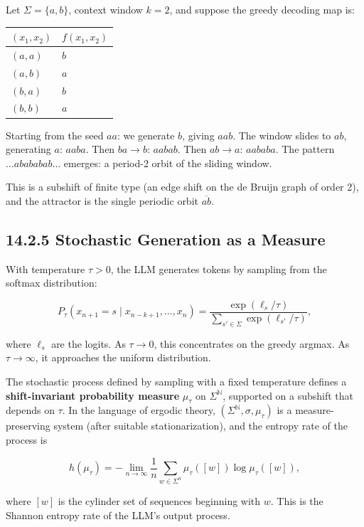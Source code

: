 \begin{example}
Let $\Sigma = \{ a, b\} $, context window $k = 2$, and suppose the greedy decoding map is:

\begin{tabular}{|l|l|}
\hline
$(x_1, x_2)$ & $f(x_1, x_2)$ \\
\hline
$(a, a)$ & $b$ \\
$(a, b)$ & $a$ \\
$(b, a)$ & $b$ \\
$(b, b)$ & $a$ \\
\hline
\end{tabular}


Starting from the seed $aa$: we generate $b$, giving $aab$. The window slides to $ab$, generating $a$: $aaba$. Then $ba \to b$: $aabab$. Then $ab \to a$: $aababa$. The pattern $\ldots abababab\ldots$ emerges: a period-2 orbit of the sliding window.

This is a subshift of finite type (an edge shift on the de Bruijn graph of order 2), and the attractor is the single periodic orbit $\overline{ab}$.
\end{example}

\subsection{14.2.5 Stochastic Generation as a Measure}

With temperature $\tau > 0$, the LLM generates tokens by sampling from the softmax distribution:

\[
P_\tau(x_{n+1} = s \mid x_{n-k+1}, \ldots, x_n) = \frac{\exp(\ell_s / \tau)}{\sum_{s' \in \Sigma} \exp(\ell_{s'} / \tau)},
\]

where $\ell_s$ are the logits. As $\tau \to 0$, this concentrates on the greedy argmax. As $\tau \to \infty$, it approaches the uniform distribution.

The stochastic process defined by sampling with a fixed temperature defines a \textbf{shift-invariant probability measure} $\mu_\tau$ on $\Sigma^{\mathbb{N}}$, supported on a subshift that depends on $\tau$. In the language of ergodic theory, $(\Sigma^{\mathbb{N}}, \sigma, \mu_\tau)$ is a measure-preserving system (after suitable stationarization), and the entropy rate of the process is

\[
h(\mu_\tau) = -\lim_{n \to \infty} \frac{1}{n} \sum_{w \in \Sigma^n} \mu_\tau([w]) \log \mu_\tau([w]),
\]

where $[w]$ is the cylinder set of sequences beginning with $w$. This is the Shannon entropy rate of the LLM's output process.

